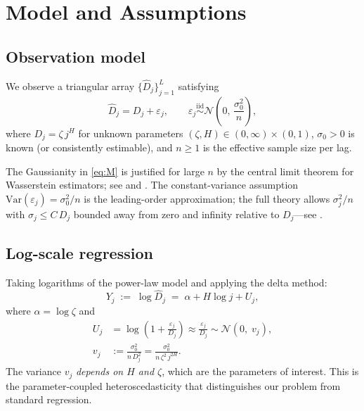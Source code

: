 \documentclass[10pt,a4paper,twocolumn]{article}
\newcommand{\Var}{\mathrm{Var}}
\newcommand{\iid}{\overset{\text{iid}}{\sim}}
\newcommand{\Dhj}{\widehat{D}_j}
\newcommand{\calN}{\mathcal{N}}
\begin{document}
\section{Model and Assumptions}
\label{sec:model}

\subsection{Observation model}

We observe a triangular array $\{\Dhj\}_{j=1}^{L}$ satisfying
\begin{equation}
    \Dhj = D_j + \varepsilon_j,\qquad
    \varepsilon_j \iid \calN\!\left(0,\,\frac{\sigma_0^2}{n}\right),
    \tag{M}
    \label{eq:M}
\end{equation}
where $D_j = \zeta\,j^H$ for unknown parameters $(\zeta, H) \in
(0,\infty)\times(0,1)$, $\sigma_0 > 0$ is known (or consistently
estimable), and $n \geq 1$ is the effective sample size per lag.

\begin{remark}
    The Gaussianity in \eqref{eq:M} is justified for large $n$ by the
    central limit theorem for Wasserstein estimators; see
    \citet{GoldfeldEtAl2022} and \citet{delBarrioEtAl2023}.  The
    constant-variance assumption $\Var(\varepsilon_j) = \sigma_0^2/n$ is
    the leading-order approximation; the full theory allows $\sigma_j^2/n$
    with $\sigma_j \leq C\,D_j$ bounded away from zero and infinity
    relative to $D_j$---see .
\end{remark}

\subsection{Log-scale regression}

Taking logarithms of the power-law model and applying the delta method:
\begin{equation}
    Y_j \;:=\; \log \Dhj \;=\; \alpha + H \log j + U_j,
    \label{eq:log-model}
\end{equation}
where $\alpha = \log \zeta$ and
\begin{align}
    U_j &= \log\!\left(1 + \frac{\varepsilon_j}{D_j}\right)
         \approx \frac{\varepsilon_j}{D_j}
         \sim \calN\!\left(0,\; v_j\right), \label{eq:log-noise}\\
    v_j &:= \frac{\sigma_0^2}{n\,D_j^2}
         = \frac{\sigma_0^2}{n\,\zeta^2\,j^{2H}}.
\end{align}
The variance $v_j$ \emph{depends on $H$ and $\zeta$}, which are the
parameters of interest.  This is the parameter-coupled heteroscedasticity
that distinguishes our problem from standard regression.
\end{document}
